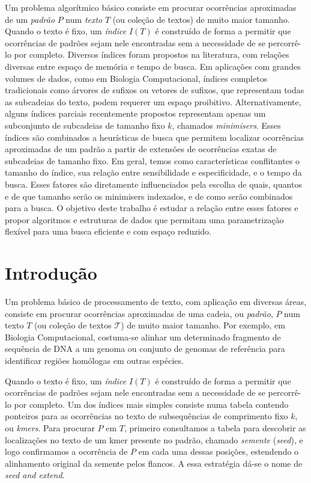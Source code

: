 \documentclass[12pt, a4paper, oneside]{article}
\begin{document}
Um problema algorítmico básico consiste em procurar ocorrências aproximadas de um \emph{padrão} $P$ num \emph{texto} $T$ (ou coleção de textos) de muito maior tamanho. Quando o texto é fixo, um \emph{índice} $I(T)$ é construído de forma a permitir que ocorrências de padrões sejam nele encontradas sem a necessidade de se percorrê-lo por completo. 
Diversos índices foram propostos na literatura, com relações diversas entre espaço de memória e tempo de busca. Em aplicações com grandes volumes de dados, como em Biologia Computacional, índices completos tradicionais como árvores de sufixos ou vetores de sufixos, que representam todas as subcadeias do texto, podem requerer um espaço proibitivo. Alternativamente, alguns índices parciais recentemente propostos representam apenas um subconjunto de subcadeias de tamanho fixo $k$, chamados \emph{minimisers}. Esses índices são combinados a heurísticas de busca que permitem localizar ocorrências aproximadas de um padrão a partir de extensões de ocorrências exatas de subcadeias de tamanho fixo. Em geral, temos como características conflitantes o tamanho do índice, sua relação entre sensibilidade e especificidade, e o tempo da busca. Esses fatores são diretamente influenciados pela escolha de quais, quantos e de que tamanho serão os minimisers indexados, e de como serão combinados para a busca. O objetivo deste trabalho é estudar a relação entre esses fatores e propor algoritmos e estruturas de dados que permitam uma parametrização flexível para uma busca eficiente e com espaço reduzido. 



\clearpage
\setcounter{page}{1}
\section{Introdução}

Um problema básico de processamento de texto, com aplicação em diversas áreas, consiste em procurar ocorrências aproximadas de uma cadeia, ou \emph{padrão}, $P$ num texto $T$ (ou coleção de textos $\mathcal{T}$) de muito maior tamanho. Por exemplo, em Biologia Computacional, costuma-se alinhar um determinado fragmento de sequência de DNA a um genoma ou conjunto de genomas de referência para identificar regiões homólogas em outras espécies. 

Quando o texto é fixo, um \emph{índice} $I(T)$ é construído de forma a permitir que ocorrências de padrões sejam nele encontradas sem a necessidade de se percorrê-lo por completo. Um dos índices mais simples consiste numa tabela contendo ponteiros para as ocorrências no texto de subsequências de comprimento fixo $k$, ou \emph{kmers}. Para procurar $P$ em $T$, primeiro consultamos a tabela para descobrir as localizações no texto de um kmer presente no padrão, chamado \emph{semente} (\emph{seed}), e logo confirmamos a ocorrência de $P$ em cada uma dessas posições, estendendo o alinhamento original da semente pelos flancos. A essa estratégia dá-se o nome de \emph{seed and extend}. 
\end{document}
